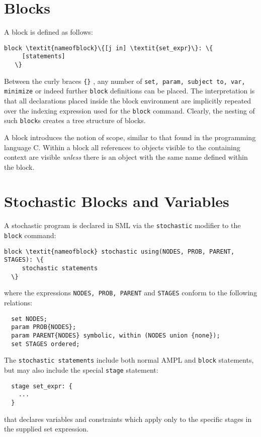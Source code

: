 \documentclass[10pt,a4paper]{book}
\begin{document}
\section{Blocks}
A block is defined as follows:

\begin{Verbatim}[commandchars=\\\{\}]
   block \textit{nameofblock}\{[j in] \textit{set_expr}\}: \{
     [statements]
   \}
\end{Verbatim}
Between the curly braces {\tt \{\}} , any number of {\tt set, param,
subject to, var, minimize} or indeed further {\tt block} definitions can be
placed. The interpretation is that all declarations placed inside the block
environment are implicitly repeated over the indexing expression used for the
{\tt block} command. Clearly, the nesting of such {\tt block}s creates a tree
structure of blocks.

A block introduces the notion of scope, similar to that found in the programming
language C. Within a block all references to objects visible to the containing
context are visible {\it unless} there is an object with the same name defined
within the block.

\section{Stochastic Blocks and Variables}
A stochastic program is declared in SML via the {\tt stochastic} modifier
to the {\tt block} command:
\begin{Verbatim}[commandchars=\\\{\}]
  block \textit{nameofblock} stochastic using(NODES, PROB, PARENT, STAGES): \{
     stochastic statements
  \}
\end{Verbatim}
where the expressions {\tt NODES, PROB, PARENT} and {\tt STAGES} conform to
the following relations:
\begin{verbatim}
  set NODES; 
  param PROB{NODES};
  param PARENT{NODES} symbolic, within (NODES union {none});
  set STAGES ordered;  
\end{verbatim}
The {\tt stochastic statements} include both normal AMPL and {\tt block}
statements, but may also include the special {\tt stage} statement:
\begin{verbatim}
  stage set_expr: {
    ...
  }
\end{verbatim}
that declares variables and constraints which apply only to the specific stages
in the supplied set expression.
\end{document}
